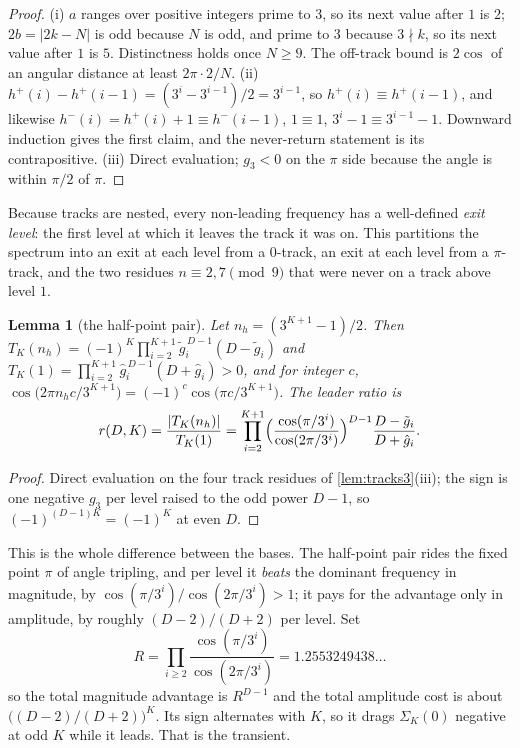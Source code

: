 \documentclass[11pt]{amsart}
\newtheorem{lemma}[theorem]{Lemma}
\theoremstyle{definition}
\theoremstyle{remark}
\begin{document}
\begin{proof}
(i) $a$ ranges over positive integers prime to $3$, so its next value after $1$ is $2$; $2b = \lvert 2k - N\rvert$ is odd because $N$ is odd, and prime to $3$ because $3 \nmid k$, so its next value after $1$ is $5$. Distinctness holds once $N \ge 9$. The off-track bound is $2\cos$ of an angular distance at least $2\pi\cdot 2/N$. (ii) $h^{+}(i) - h^{+}(i-1) = (3^i - 3^{i-1})/2 = 3^{i-1}$, so $h^{+}(i)\equiv h^{+}(i-1)$, and likewise $h^{-}(i) = h^{+}(i)+1 \equiv h^{-}(i-1)$, $1 \equiv 1$, $3^i - 1 \equiv 3^{i-1}-1$. Downward induction gives the first claim, and the never-return statement is its contrapositive. (iii) Direct evaluation; $g_3 < 0$ on the $\pi$ side because the angle is within $\pi/2$ of $\pi$.
\end{proof}

Because tracks are nested, every non-leading frequency has a well-defined \emph{exit level}: the first level at which it leaves the track it was on. This partitions the spectrum into an exit at each level from a $0$-track, an exit at each level from a $\pi$-track, and the two residues $n \equiv 2, 7 \pmod 9$ that were never on a track above level $1$.

\begin{lemma}[the half-point pair]
\label{lem:half3}
Let $n_h = (3^{K+1}-1)/2$. Then $T_K(n_h) = (-1)^K\prod_{i=2}^{K+1}\tilde g_i^{\,D-1}(D - \tilde g_i)$ and $T_K(1) = \prod_{i=2}^{K+1}\hat g_i^{\,D-1}(D + \hat g_i) > 0$, and for integer $c$, $\cos\bigl(2\pi n_h c/3^{K+1}\bigr) = (-1)^c\cos\bigl(\pi c/3^{K+1}\bigr)$. The leader ratio is
\[
  r(D,K) = \frac{\lvert T_K(n_h)\rvert}{T_K(1)} = \prod_{i=2}^{K+1}\Bigl(\frac{\cos(\pi/3^i)}{\cos(2\pi/3^i)}\Bigr)^{D-1}\frac{D - \tilde g_i}{D + \hat g_i}.
\]
\end{lemma}

\begin{proof}
Direct evaluation on the four track residues of \cref{lem:tracks3}(iii); the sign is one negative $g_3$ per level raised to the odd power $D-1$, so $(-1)^{(D-1)K} = (-1)^K$ at even $D$.
\end{proof}

This is the whole difference between the bases. The half-point pair rides the fixed point $\pi$ of angle tripling, and per level it \emph{beats} the dominant frequency in magnitude, by $\cos(\pi/3^i)/\cos(2\pi/3^i) > 1$; it pays for the advantage only in amplitude, by roughly $(D-2)/(D+2)$ per level. Set
\[
  R = \prod_{i \ge 2}\frac{\cos(\pi/3^i)}{\cos(2\pi/3^i)} = 1.2553249438\ldots
\]
so the total magnitude advantage is $R^{D-1}$ and the total amplitude cost is about $\bigl((D-2)/(D+2)\bigr)^{K}$. Its sign alternates with $K$, so it drags $\Sigma_K(0)$ negative at odd $K$ while it leads. That is the transient.
\end{document}
